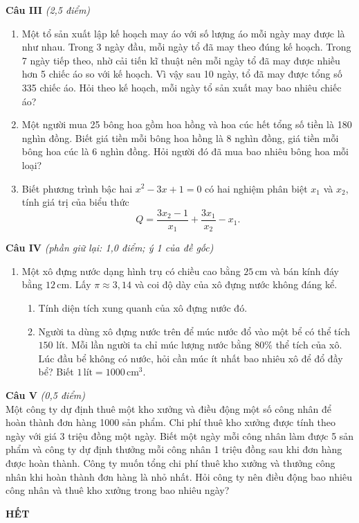 \documentclass[12pt,a4paper]{article}
\newcommand{\diem}[1]{\textit{(#1 điểm)}}
\begin{document}
\textbf{Câu III} \diem{2,5}
\begin{enumerate}
  \item Một tổ sản xuất lập kế hoạch may áo với số lượng áo mỗi ngày may được là như nhau. Trong 3 ngày đầu, mỗi ngày tổ đã may theo đúng kế hoạch. Trong 7 ngày tiếp theo, nhờ cải tiến kĩ thuật nên mỗi ngày tổ đã may được nhiều hơn 5 chiếc áo so với kế hoạch. Vì vậy sau 10 ngày, tổ đã may được tổng số 335 chiếc áo. Hỏi theo kế hoạch, mỗi ngày tổ sản xuất may bao nhiêu chiếc áo?

  \item Một người mua 25 bông hoa gồm hoa hồng và hoa cúc hết tổng số tiền là 180 nghìn đồng. Biết giá tiền mỗi bông hoa hồng là 8 nghìn đồng, giá tiền mỗi bông hoa cúc là 6 nghìn đồng. Hỏi người đó đã mua bao nhiêu bông hoa mỗi loại?

  \item Biết phương trình bậc hai $x^2-3x+1=0$ có hai nghiệm phân biệt $x_1$ và $x_2$, tính giá trị của biểu thức
  \[
    Q=\frac{3x_2-1}{x_1}+\frac{3x_1}{x_2}-x_1.
  \]
\end{enumerate}

\textbf{Câu IV} \textit{(phần giữ lại: 1,0 điểm; ý 1 của đề gốc)}
\begin{enumerate}
  \item Một xô đựng nước dạng hình trụ có chiều cao bằng $25\,\mathrm{cm}$ và bán kính đáy bằng $12\,\mathrm{cm}$. Lấy $\pi\approx 3{,}14$ và coi độ dày của xô đựng nước không đáng kể.
  \begin{enumerate}[label=\alph*)]
    \item Tính diện tích xung quanh của xô đựng nước đó.
    \item Người ta dùng xô đựng nước trên để múc nước đổ vào một bể có thể tích $150$ lít. Mỗi lần người ta chỉ múc lượng nước bằng $80\%$ thể tích của xô. Lúc đầu bể không có nước, hỏi cần múc ít nhất bao nhiêu xô để đổ đầy bể? Biết $1\,\mathrm{lít}=1000\,\mathrm{cm}^3$.
  \end{enumerate}
\end{enumerate}

\textbf{Câu V} \diem{0,5}\\
Một công ty dự định thuê một kho xưởng và điều động một số công nhân để hoàn thành đơn hàng 1000 sản phẩm. Chi phí thuê kho xưởng được tính theo ngày với giá 3 triệu đồng một ngày. Biết một ngày mỗi công nhân làm được 5 sản phẩm và công ty dự định thưởng mỗi công nhân 1 triệu đồng sau khi đơn hàng được hoàn thành. Công ty muốn tổng chi phí thuê kho xưởng và thưởng công nhân khi hoàn thành đơn hàng là nhỏ nhất. Hỏi công ty nên điều động bao nhiêu công nhân và thuê kho xưởng trong bao nhiêu ngày?

\begin{center}\textbf{HẾT}\end{center}
\end{document}
